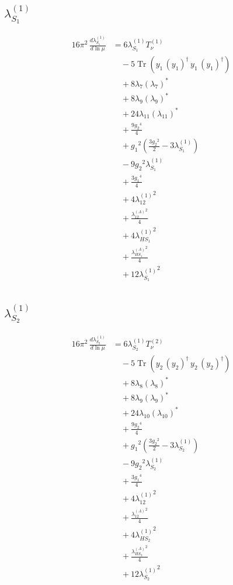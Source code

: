 \documentclass[10pt,a4paper]{article}
\begin{document}
\subsection*{$\lambda_{S_1}^{(1)}$}
\begin{align*}
16\pi^2\,\frac{d \lambda_{S_1}^{(1)}}{d\ln\mu} &=6 {\lambda_{S_1}^{(1)}} T_{\nu}^{(1)} \\
&\quad -5 \operatorname{Tr}\!\left({y_1}\,\left({y_1}\right)^{\dagger}\,{y_1}\,\left({y_1}\right)^{\dagger}\right) \\
&\quad +8 {\lambda_{7}} \left({\lambda_{7}}\right)^{*} \\
&\quad +8 {\lambda_{9}} \left({\lambda_{9}}\right)^{*} \\
&\quad +24 {\lambda_{11}} \left({\lambda_{11}}\right)^{*} \\
&\quad +\frac{9 {g_2}^4}{4} \\
&\quad +{g_1}^2 \left(\frac{3 {g_2}^2}{2}-3 {\lambda_{S_1}^{(1)}}\right) \\
&\quad -9 {g_2}^2 {\lambda_{S_1}^{(1)}} \\
&\quad +\frac{3 {g_1}^4}{4} \\
&\quad +4 {\lambda_{12}^{(1)}}^2 \\
&\quad +\frac{{\lambda_{12}^{(A)}}^2}{4} \\
&\quad +4 {\lambda_{HS_1}^{(1)}}^2 \\
&\quad +\frac{{\lambda_{HS_1}^{(A)}}^2}{4} \\
&\quad +12 {\lambda_{S_1}^{(1)}}^2 \\
\end{align*}
\subsection*{$\lambda_{S_2}^{(1)}$}
\begin{align*}
16\pi^2\,\frac{d \lambda_{S_2}^{(1)}}{d\ln\mu} &=6 {\lambda_{S_2}^{(1)}} T_{\nu}^{(2)} \\
&\quad -5 \operatorname{Tr}\!\left({y_2}\,\left({y_2}\right)^{\dagger}\,{y_2}\,\left({y_2}\right)^{\dagger}\right) \\
&\quad +8 {\lambda_{8}} \left({\lambda_{8}}\right)^{*} \\
&\quad +8 {\lambda_{9}} \left({\lambda_{9}}\right)^{*} \\
&\quad +24 {\lambda_{10}} \left({\lambda_{10}}\right)^{*} \\
&\quad +\frac{9 {g_2}^4}{4} \\
&\quad +{g_1}^2 \left(\frac{3 {g_2}^2}{2}-3 {\lambda_{S_2}^{(1)}}\right) \\
&\quad -9 {g_2}^2 {\lambda_{S_2}^{(1)}} \\
&\quad +\frac{3 {g_1}^4}{4} \\
&\quad +4 {\lambda_{12}^{(1)}}^2 \\
&\quad +\frac{{\lambda_{12}^{(A)}}^2}{4} \\
&\quad +4 {\lambda_{HS_2}^{(1)}}^2 \\
&\quad +\frac{{\lambda_{HS_2}^{(A)}}^2}{4} \\
&\quad +12 {\lambda_{S_2}^{(1)}}^2 \\
\end{align*}
\end{document}
